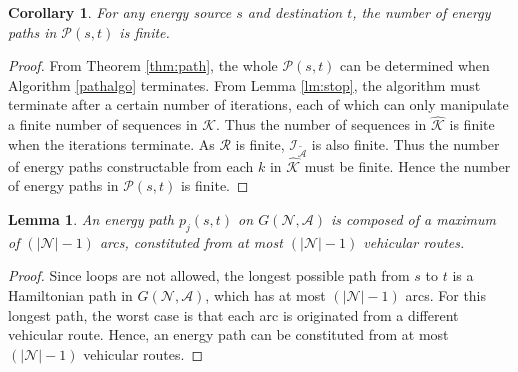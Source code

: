 \documentclass[journal]{IEEEtran}
\newtheorem{lemma}{\textbf{Lemma}}
\newtheorem{corollary}{\textbf{Corollary}}
\begin{document}
\begin{corollary}
For any energy source $s$ and destination $t$, the number of energy paths in $\mathcal{P}(s,t)$ is finite.
\end{corollary}
\begin{proof}
From Theorem \ref{thm:path}, the whole $\mathcal{P}(s,t)$ can be determined when Algorithm \ref{pathalgo} terminates. From Lemma \ref{lm:stop}, the algorithm must terminate after a certain number of iterations, each of which can only manipulate a finite number of sequences in $\mathcal{K}$. Thus the number of sequences in $\hat{\mathcal{K}}$ is finite when the iterations terminate.
As $\mathcal{R}$ is finite, $\mathcal{I}_{\tilde{\mathcal{A}}}$ is also finite. Thus the number of energy paths constructable from each $k$ in $\hat{\mathcal{K}}$ must be finite.
Hence the number of energy paths in $\mathcal{P}(s,t)$ is finite.
\end{proof}

\begin{lemma} \label{lm:length}
An energy path $p_j(s,t)$ on $G(\mathcal{N},\mathcal{A})$ is composed of a maximum of $(|\mathcal{N}|-1)$ arcs, constituted from at most $(|\mathcal{N}|-1)$ vehicular routes.
\end{lemma}
\begin{proof}
Since loops are not allowed, the longest possible path from $s$ to $t$ is a Hamiltonian path in $G(\mathcal{N},\mathcal{A})$, which has at most $(|\mathcal{N}|-1)$ arcs.  For this longest path, the worst case is that each arc is originated from a different vehicular route. Hence, an energy path can be constituted from at most $(|\mathcal{N}|-1)$ vehicular routes.
\end{proof}
\end{document}
